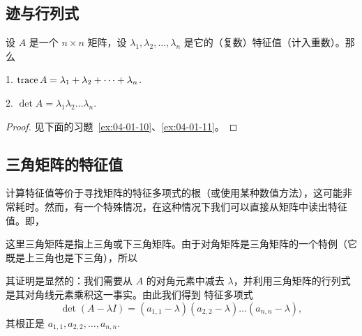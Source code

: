 \subsection{迹与行列式}\label{sec:04-01-06}

\begin{theorem}\label{stmt:04-01-02} 设 $A$ 是一个 $n \times n$ 矩阵，设 $\lambda_1, \lambda_2, \dots, \lambda_n$ 是它的（复数）特征值（计入重数）。那么

1. $\operatorname{trace} A = \lambda_1 + \lambda_2 + \dots + \lambda_n$.~

2. $\det A = \lambda_1 \lambda_2 \dots \lambda_n$.~\end{theorem}

\begin{proof}见下面的习题~\ref{ex:04-01-10}、\ref{ex:04-01-11}。\end{proof}

\subsection{三角矩阵的特征值}\label{sec:04-01-07}

计算特征值等价于寻找矩阵的特征多项式的根（或使用某种数值方法），这可能非常耗时。然而，有一个特殊情况，在这种情况下我们可以直接从矩阵中读出特征值。即，


这里三角矩阵是指上三角或下三角矩阵。由于对角矩阵是三角矩阵的一个特例（它既是上三角也是下三角），所以



其证明是显然的：我们需要从 $A$ 的对角元素中减去 $\lambda$，并利用三角矩阵的行列式是其对角线元素乘积这一事实。由此我们得到
特征多项式
$$\det(A - \lambda I) = (a_{1,1} - \lambda)(a_{2,2} - \lambda)\dots(a_{n,n} - \lambda),$$
其根正是 $a_{1,1}, a_{2,2}, \dots, a_{n,n}$.~

